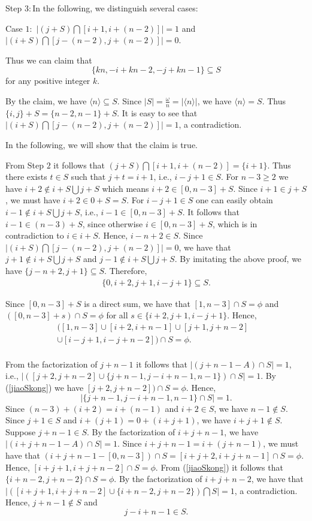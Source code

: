 \documentclass[preprint]{elsarticle}
\begin{document}
Step $3:$In the following, we distinguish several cases:

Case $1:$ $|(j+S)\bigcap [i+1,i+(n-2)]|=1$ and $|(i+S)\bigcap [j-(n-2),j+(n-2)]|=0$.

Thus we can claim that $$\{kn,-i+kn-2,-j+kn-1\}\subseteq S$$ for any positive integer $k$.

By the claim, we have $\langle n\rangle\subseteq S$.
Since $|S|=\frac{\omega}{n}=|\langle n\rangle|$, we have $\langle n\rangle=S$.
Thus $\{i,j\}+S=\{n-2,n-1\}+S$.
It is easy to see that $|(i+S)\bigcap [j-(n-2),j+(n-2)]|=1$, a contradiction.

In the following, we will show that the claim is true.

From Step $2$ it follows that $(j+S)\bigcap [i+1,i+(n-2)]=\{i+1\}$.
Thus there exists $t\in S$ such that $j+t=i+1$, i.e., $i-j+1\in S$.
For $n-3\geq 2$ we have $i+2\not\in i+S\bigcup j+S$ which means $i+2\in [0,n-3]+S$.
Since $i+1\in j+S$, we must have $i+2\in 0+S=S$.
For $i-j+1\in S$ one can easily obtain $i-1\not\in i+S\bigcup j+S$, i.e., $i-1\in [0,n-3]+S$.
It follows that $i-1\in (n-3)+S$, since otherwise $i\in [0,n-3]+S$,
which is in contradiction to $i\in i+S$.
Hence, $i-n+2\in S$.
Since $|(i+S)\bigcap [j-(n-2),j+(n-2)]|=0$,
we have that $j+1\not\in i+S\bigcup j+S$ and $j-1\not\in i+S\bigcup j+S$.
By imitating the above proof, we have $\{j-n+2,j+1\}\subseteq S$.
Therefore, \begin{gather}
\{0,i+2,j+1,i-j+1\}\subseteq S.   \label{shuyuS}
\end{gather}

Since $[0,n-3]+S$ is a direct sum, we have that $[1,n-3]\cap S=\phi$ and $([0,n-3]+s)\cap S=\phi$ for all $s\in \{i+2,j+1,i-j+1\}$.
Hence,
\begin{equation}
\label{jiaoSkong}
   \begin{aligned}
   ([1,n-3]\cup [i+2,i+n-1]\cup [j+1,j+n-2]& \\
   \cup [i-j+1,i-j+n-2])\cap S=\phi.&  \\
   \end{aligned}
  \end{equation}

From the factorization of $j+n-1$ it follows that $|(j+n-1-A)\cap S|=1$, i.e.,
$|([j+2,j+n-2]\cup \{j+n-1,j-i+n-1,n-1\})\cap S|=1$.
By (\ref{jiaoSkong}) we have $[j+2,j+n-2])\cap S=\phi$.
Hence, $$|\{j+n-1,j-i+n-1,n-1\}\cap S|=1.$$
Since $(n-3)+(i+2)=i+(n-1)$ and $i+2\in S$, we have $n-1\not\in S$.
Since $j+1\in S$ and $i+(j+1)=0+(i+j+1)$, we have $i+j+1\not\in S$.
Suppose $j+n-1\in S$.
By the factorization of $i+j+n-1$, we have $|(i+j+n-1-A)\cap S|=1$.
Since $i+j+n-1=i+(j+n-1)$,
we must have that $(i+j+n-1-[0,n-3])\cap S=[i+j+2,i+j+n-1]\cap S=\phi$.
Hence, $[i+j+1,i+j+n-2]\cap S=\phi$.
From (\ref{jiaoSkong}) it follows that $\{i+n-2,j+n-2\}\cap S=\phi$.
By the factorization of $i+j+n-2$,
we have that $|([i+j+1,i+j+n-2]\cup \{i+n-2,j+n-2\})\bigcap S|=1$, a contradiction.
Hence, $j+n-1\not\in S$ and $$j-i+n-1\in S.$$
\end{document}
